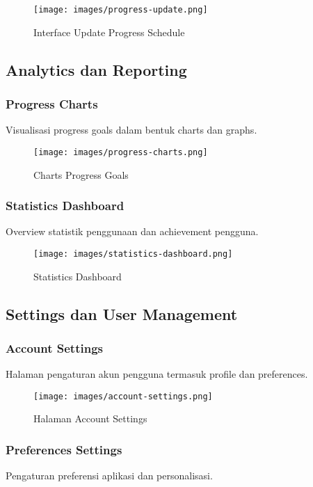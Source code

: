 \begin{figure}[H]
\centering
\texttt{[image: images/progress-update.png]}
\caption{Interface Update Progress Schedule}
\label{fig:progress-update}
\end{figure}

\subsection{Analytics dan Reporting}

\subsubsection{Progress Charts}
Visualisasi progress goals dalam bentuk charts dan graphs.

\begin{figure}[H]
\centering
\texttt{[image: images/progress-charts.png]}
\caption{Charts Progress Goals}
\label{fig:progress-charts}
\end{figure}

\subsubsection{Statistics Dashboard}
Overview statistik penggunaan dan achievement pengguna.

\begin{figure}[H]
\centering
\texttt{[image: images/statistics-dashboard.png]}
\caption{Statistics Dashboard}
\label{fig:statistics}
\end{figure}

\subsection{Settings dan User Management}

\subsubsection{Account Settings}
Halaman pengaturan akun pengguna termasuk profile dan preferences.

\begin{figure}[H]
\centering
\texttt{[image: images/account-settings.png]}
\caption{Halaman Account Settings}
\label{fig:account-settings}
\end{figure}

\subsubsection{Preferences Settings}
Pengaturan preferensi aplikasi dan personalisasi.

